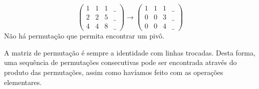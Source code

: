 \begin{exemplo*}
   \begin{equation*}
   \begin{pmatrix}
      1 & 1 & 1 & \_ \\
      2 & 2 & 5 & \_ \\
      4 & 4 & 8 & \_
   \end{pmatrix}
   \rightarrow 
   \begin{pmatrix}
      1 & 1 & 1 & \_ \\
      0 & 0 & 3 & \_ \\
      0 & 0 & 4 & \_
   \end{pmatrix}
	\end{equation*}
	Não há permutação que permita encontrar um pivô.
\end{exemplo*}

A matriz de permutação é sempre a identidade com linhas trocadas. Desta forma, uma sequência de permutações consecutivas pode ser encontrada através do produto das permutações, assim como havíamos feito com as operações elementares.
